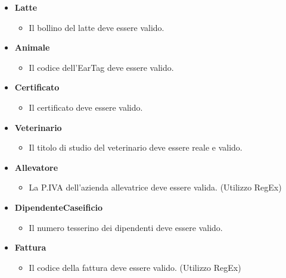 \documentclass[12pt]{report}
\begin{document}
\begin{itemize}
\begin{itemize}
	\end{itemize}
\item \textbf{Latte}
	\begin{itemize}
	\item Il bollino del latte deve essere valido. 
	\end{itemize}
	\item \textbf{Animale}
	\begin{itemize}
	\item Il codice dell'EarTag deve essere valido. 
	\end{itemize}
		\item \textbf{Certificato}
	\begin{itemize}
	\item Il certificato deve essere valido.
	\end{itemize}
	\item \textbf{Veterinario}
	\begin{itemize}
	\item Il titolo di studio del veterinario deve essere reale e valido. 
	\end{itemize}
	\item \textbf{Allevatore}
	\begin{itemize}
	\item La P.IVA dell'azienda allevatrice deve essere valida. (Utilizzo RegEx)
	\end{itemize}
	\item \textbf{DipendenteCaseificio}
	\begin{itemize}
	\item Il numero tesserino dei dipendenti deve essere valido.
	\end{itemize}
\item \textbf{Fattura}
	\begin{itemize}
	\item Il codice della fattura deve essere valido. (Utilizzo RegEx)
	\end{itemize}


\end{itemize}
\end{document}
